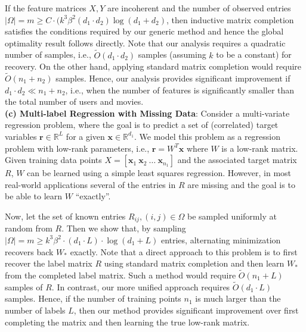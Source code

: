 \documentclass[11pt]{article}
\newcommand{\R}{\mathbb{R}}
\newcommand{\tp}[1]{{#1}^{T}}
\newcommand{\Wo}{W_*}
\newcommand{\x}{\bm{x}}
\newcommand{\y}{\bm{y}}
\begin{document}
If the feature matrices $X, Y$ are incoherent and  the number of observed entries $|\Omega|=m\geq C\cdot (k^3 \beta^2 (d_1\cdot d_2)\log(d_1+d_2)$, then inductive matrix completion satisfies  the conditions required by our generic method and hence the global optimality result follows directly. Note that our analysis requires a quadratic number of samples, i.e., $\widetilde{O}(d_1\cdot d_2)$ samples (assuming $k$ to be a constant) for recovery. On the other hand, applying standard matrix completion would require $\widetilde{O}(n_1+n_2)$ samples. Hence, our analysis provides significant improvement if $d_1\cdot d_2\ll n_1+n_2$, i.e., when the number of features is significantly smaller than the total number of users and movies. \\[8pt]%
{\bf (c) Multi-label Regression with Missing Data}: Consider a multi-variate regression problem, where the goal is to predict a set of (correlated) target variables $\bm{r}\in \R^{L}$ for a given $\x\in \R^{d_1}$.  We model this problem as a regression problem with low-rank parameters, i.e., $\bm{r}=\tp{W}\x$ where $W$ is a low-rank matrix. Given training data points $X=[\x_1\  \x_2\ \dots\ \x_{n_1}]$ and the associated target matrix $R$, $W$ can be learned using a simple least squares regression. However, in most real-world applications several of the entries in $R$ are missing and the goal is to be able to learn $W$ ``exactly''. 

Now, let the set of known entries $R_{ij}, (i,j)\in \Omega$ be sampled uniformly at random from $R$. Then we show that, by sampling $|\Omega|=m\geq k^3 \beta^2 \cdot (d_1\cdot L)\cdot \log(d_1+L)$ entries, alternating minimization recovers back $\Wo$ exactly. Note that a direct approach to this problem is to first recover the label matrix $R$ using standard matrix completion and then learn $\Wo$ from the completed label matrix. Such a method would require $\tilde{O}(n_1+L)$ samples of $R$. In contrast, our more unified approach requires $\tilde{O}(d_1\cdot L)$ samples. Hence, if the number of training points $n_1$ is much larger than the number of labels $L$, then our method  provides significant improvement over first completing the matrix and then learning the true low-rank matrix. 
\end{document}
